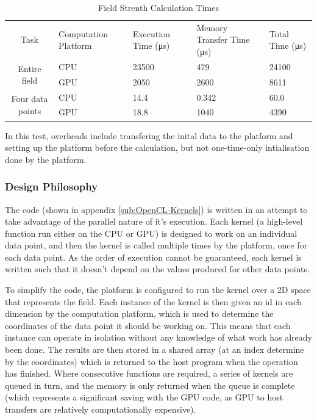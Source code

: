 \documentclass[10pt]{article} \usepackage[a4paper]{geometry}
\begin{document}
\begin{singlespace}
\begin{table}
\centering%
\begin{tabular}{|c|m{2cm}|p{2cm}|p{3cm}|m{2cm}|}
\hline
\multirow{2}{*}{Task} & \multirow{2}{3cm}{Computation Platform} &
\multirow{2}{2cm}{Execution Time (\si{\micro\second})} &
\multirow{2}{3cm}{Memory Transfer Time (\si{\micro\second})} &
\multirow{2}{1.8cm}{Total Time (\si{\micro\second})} \\
 &  &  &  & \\
\hline
\multirow{2}{*}{Entire field} & \ac{CPU} & \num{23500} & \num{479} & \num{24100}
\\
\cline{2-5}
 & \ac{GPU} & \num{2050} & \num{2600} & \num{8611} \\
\hline
\multirow{2}{*}{Four data points} & \ac{CPU} & \num{14.4} & \num{0.342} &
\num{60.0}
\\
\cline{2-5}
 & \ac{GPU} & \num{18.8} & \num{1040} & \num{4390} \\
\hline
\end{tabular}

In this test, overheads include transfering the inital data to the platform and
setting up the platform before the calculation, but not one-time-only
intialisation done by the platform.

\caption{Field Strenth Calculation Times\label{tab:Field-Strenth-Calculation}}
\end{table}

\end{singlespace}

\subsubsection{Design Philosophy}

The code (shown in appendix \ref{sub:OpenCL-Kernels}) is written in an attempt
to take advantage of the parallel nature of it's execution. Each kernel (a
high-level function run either on the \ac{CPU} or \ac{GPU}) is designed to work
on an individual data point, and then the kernel is called multiple times by the
platform, once for each data point. As the order of execution cannot be
guaranteed, each kernel is written such that it doesn't depend on the values
produced for other data points.

To simplify the code, the platform is configured to run the kernel over a 2D
space that represents the field. Each instance of the kernel is then given an id
in each dimension by the computation platform, which is used to determine the
coordinates of the data point it should be working on. This means that each
instance can operate in isolation without any knowledge of what work has already
been done. The results are then stored in a shared array (at an index determine
by the coordinates) which is returned to the host program when the operation has
finished. Where consecutive functions are required, a series of kernels are
queued in turn, and the memory is only returned when the queue is complete
(which represents a significant saving with the \ac{GPU} code, as \ac{GPU} to
host transfers are relatively computationally expensive).
\end{document}
